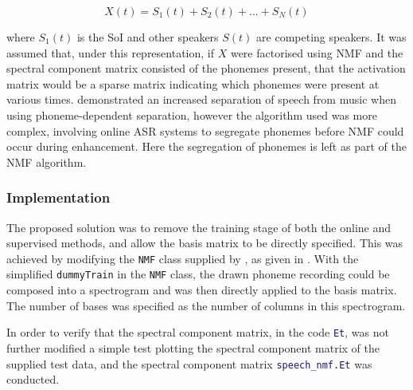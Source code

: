 \[
X\left(t\right)=S_{1}\left(t\right)+S_{2}\left(t\right)+...+S_{N}\left(t\right)
\]


where $S_{1}\left(t\right)$ is the \ac{SoI} and other speakers $S\left(t\right)$
are competing speakers. It was assumed that, under this representation,
if $X$ were factorised using \ac{NMF} and the spectral component
matrix consisted of the phonemes present, that the activation matrix
would be a sparse matrix indicating which phonemes were present at
various times. \citet{Raj2011} demonstrated an increased separation
of speech from music when using phoneme-dependent separation, however
the algorithm used was more complex, involving online \ac{ASR} systems
to segregate phonemes before \ac{NMF} could occur during enhancement.
Here the segregation of phonemes is left as part of the \ac{NMF}
algorithm.


\subsubsection*{Implementation}

The proposed solution was to remove the training stage of both the
online and supervised methods, and allow the basis matrix to be directly
specified. This was achieved by modifying the \lstinline[language=bash]!NMF!
class supplied by \citet{mohammadiha2013supervised}, as given in
. With the simplified \lstinline[language=bash]!dummyTrain!
in the \lstinline[language=bash]!NMF! class, the drawn phoneme recording
could be composed into a spectrogram and was then directly applied
to the basis matrix. The number of bases was specified as the number
of columns in this spectrogram.

In order to verify that the spectral component matrix, in the code
\lstinline[language=Matlab]!Et!, was not further modified a simple
test plotting the spectral component matrix of the supplied test data,
and the spectral component matrix \lstinline[language=Matlab]!speech_nmf.Et!
was conducted.
